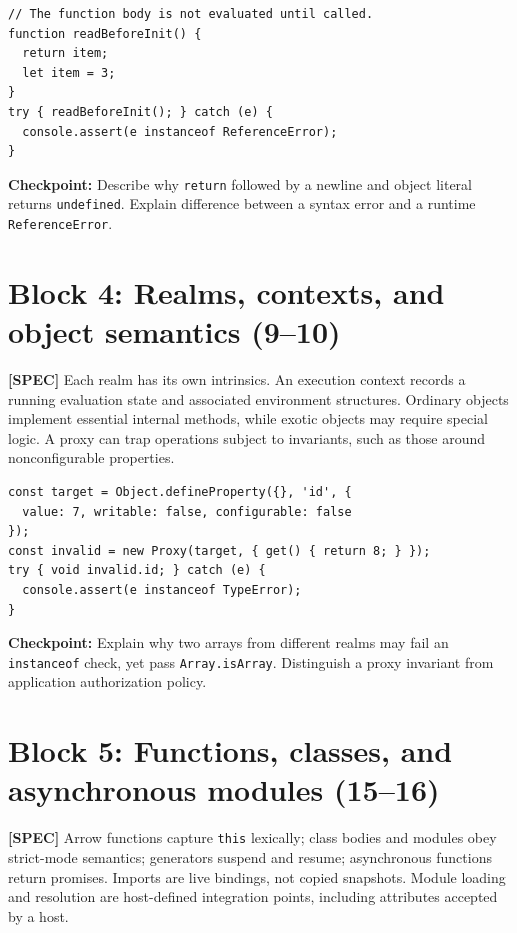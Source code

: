 \documentclass[11pt,letterpaper]{article}
\newcommand{\passthrough}[1]{#1}
\begin{document}
\begin{lstlisting}
// The function body is not evaluated until called.
function readBeforeInit() {
  return item;
  let item = 3;
}
try { readBeforeInit(); } catch (e) {
  console.assert(e instanceof ReferenceError);
}
\end{lstlisting}

\textbf{Checkpoint:} Describe why \passthrough{\lstinline!return!} followed by a newline and object literal returns \passthrough{\lstinline!undefined!}. Explain difference between a syntax error and a runtime \passthrough{\lstinline!ReferenceError!}.

\section{Block 4: Realms, contexts, and object semantics (9--10)}\label{block-4-realms-contexts-and-object-semantics-910}

\textbf{{[}SPEC{]}} Each realm has its own intrinsics. An execution context records a running evaluation state and associated environment structures. Ordinary objects implement essential internal methods, while exotic objects may require special logic. A proxy can trap operations subject to invariants, such as those around nonconfigurable properties.

\begin{lstlisting}
const target = Object.defineProperty({}, 'id', {
  value: 7, writable: false, configurable: false
});
const invalid = new Proxy(target, { get() { return 8; } });
try { void invalid.id; } catch (e) {
  console.assert(e instanceof TypeError);
}
\end{lstlisting}

\textbf{Checkpoint:} Explain why two arrays from different realms may fail an \passthrough{\lstinline!instanceof!} check, yet pass \passthrough{\lstinline!Array.isArray!}. Distinguish a proxy invariant from application authorization policy.

\section{Block 5: Functions, classes, and asynchronous modules (15--16)}\label{block-5-functions-classes-and-asynchronous-modules-1516}

\textbf{{[}SPEC{]}} Arrow functions capture \passthrough{\lstinline!this!} lexically; class bodies and modules obey strict-mode semantics; generators suspend and resume; asynchronous functions return promises. Imports are live bindings, not copied snapshots. Module loading and resolution are host-defined integration points, including attributes accepted by a host.
\end{document}
